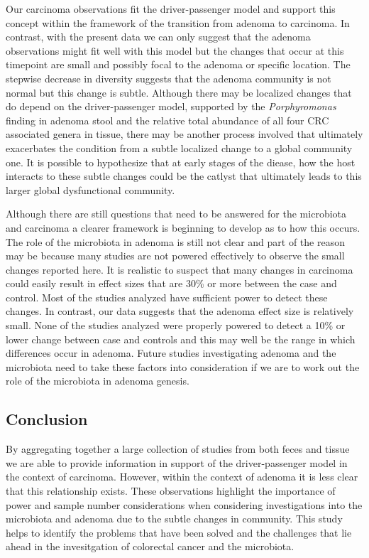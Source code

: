 \documentclass[12pt,]{article}
\begin{document}
Our carcinoma observations fit the driver-passenger model and support
this concept within the framework of the transition from adenoma to
carcinoma. In contrast, with the present data we can only suggest that
the adenoma observations might fit well with this model but the changes
that occur at this timepoint are small and possibly focal to the adenoma
or specific location. The stepwise decrease in diversity suggests that
the adenoma community is not normal but this change is subtle. Although
there may be localized changes that do depend on the driver-passenger
model, supported by the \emph{Porphyromonas} finding in adenoma stool
and the relative total abundance of all four CRC associated genera in
tissue, there may be another process involved that ultimately
exacerbates the condition from a subtle localized change to a global
community one. It is possible to hypothesize that at early stages of the
diease, how the host interacts to these subtle changes could be the
catlyst that ultimately leads to this larger global dysfunctional
community.

Although there are still questions that need to be answered for the
microbiota and carcinoma a clearer framework is beginning to develop as
to how this occurs. The role of the microbiota in adenoma is still not
clear and part of the reason may be because many studies are not powered
effectively to observe the small changes reported here. It is realistic
to suspect that many changes in carcinoma could easily result in effect
sizes that are 30\% or more between the case and control. Most of the
studies analyzed have sufficient power to detect these changes. In
contrast, our data suggests that the adenoma effect size is relatively
small. None of the studies analyzed were properly powered to detect a
10\% or lower change between case and controls and this may well be the
range in which differences occur in adenoma. Future studies
investigating adenoma and the microbiota need to take these factors into
consideration if we are to work out the role of the microbiota in
adenoma genesis.

\subsection{Conclusion}\label{conclusion}

By aggregating together a large collection of studies from both feces
and tissue we are able to provide information in support of the
driver-passenger model in the context of carcinoma. However, within the
context of adenoma it is less clear that this relationship exists. These
observations highlight the importance of power and sample number
considerations when considering investigations into the microbiota and
adenoma due to the subtle changes in community. This study helps to
identify the problems that have been solved and the challenges that lie
ahead in the invesitgation of colorectal cancer and the microbiota.
\end{document}
